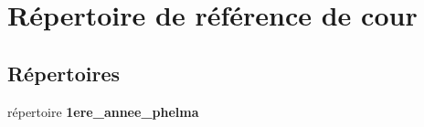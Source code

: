 \section{Répertoire de référence de cour}
\label{dir_cc35d4081a02d436786e27237031b5eb}
\subsection*{Répertoires}
\begin{DoxyCompactItemize}
\item 
répertoire {\bf 1ere\-\_\-annee\-\_\-phelma}
\end{DoxyCompactItemize}
